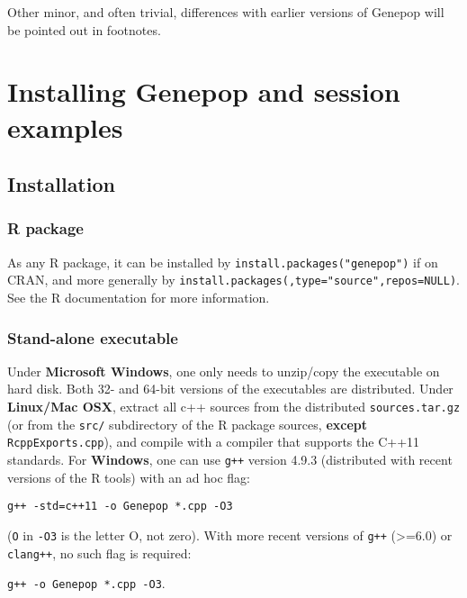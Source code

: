 \documentclass[
  12pt,
]{book}
\begin{document}
Other minor, and often trivial, differences with earlier versions of Genepop will be pointed out in footnotes.

\hypertarget{installing-genepop-and-session-examples}{%
\chapter{Installing Genepop and session examples}\label{installing-genepop-and-session-examples}}

\hypertarget{installation}{%
\section{Installation}\label{installation}}

\hypertarget{r-package}{%
\subsection{R package}\label{r-package}}

As any R package, it can be installed by \texttt{install.packages("genepop")} if on CRAN, and more generally by
\texttt{install.packages(}\texttt{,type="source",repos=NULL)}. See the R documentation for more information.

\hypertarget{stand-alone-executable}{%
\subsection{Stand-alone executable}\label{stand-alone-executable}}

Under \textbf{Microsoft Windows}, one only needs to unzip/copy the executable on hard disk. Both 32- and 64-bit versions of the executables are distributed. Under \textbf{Linux/Mac OSX},  extract all c++ sources from the distributed \texttt{sources.tar.gz} (or from the \texttt{src/} subdirectory of the R package sources, \textbf{except} \texttt{RcppExports.cpp}), and compile with a compiler that supports the C++11 standards. For \textbf{Windows}, one can use \texttt{g++} version 4.9.3 (distributed with recent versions of the R tools) with an ad hoc flag:

\texttt{g++\ -std=c++11\ -o\ Genepop\ *.cpp\ -O3}

(\texttt{O} in \texttt{-O3} is the letter O, not zero).
With more recent versions of \texttt{g++} (\textgreater=6.0) or \texttt{clang++}, no such flag is required:

\texttt{g++\ -o\ Genepop\ *.cpp\ -O3}.
\end{document}
